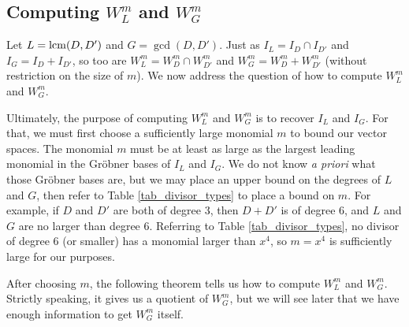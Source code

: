
\subsection{Computing $W_L^m$ and $W_G^m$}

Let $L = \operatorname{lcm}(D, D')$ and $G = \gcd(D, D')$.
Just as $I_L = I_D \cap I_{D'}$ and $I_G = I_D + I_{D'}$,
so too are $W_L^m = W_D^m \cap W_{D'}^m$ and $W_G^m = W_D^m + W_{D'}^m$
(without restriction on the size of $m$).
We now address the question of how to compute $W_L^m$ and $W_G^m$.

Ultimately, the purpose of computing $W_L^m$ and $W_G^m$ is to recover $I_L$ and $I_G$.
For that, we must first choose a sufficiently large monomial $m$ to bound our vector spaces.
The monomial $m$ must be at least as large as the largest leading monomial in the Gr\"obner bases of $I_L$ and $I_G$.
We do not know \emph{a priori} what those Gr\"obner bases are,
but we may place an upper bound on the degrees of $L$ and $G$,
then refer to Table \ref{tab_divisor_types} to place a bound on $m$.
For example, if $D$ and $D'$ are both of degree 3, then $D + D'$ is of degree 6,
and $L$ and $G$ are no larger than degree 6.
Referring to Table \ref{tab_divisor_types},
no divisor of degree 6 (or smaller) has a monomial larger than $x^4$,
so $m = x^4$ is sufficiently large for our purposes.

After choosing $m$, the following theorem tells us how to compute $W_L^m$ and $W_G^m$.
Strictly speaking, it gives us a quotient of $W_G^m$,
but we will see later that we have enough information to get $W_G^m$ itself.

